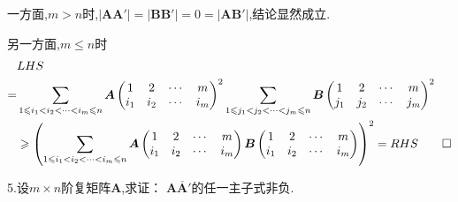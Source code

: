 \begin{Proof}
一方面,$m > n$时,$\left|
    \bm{AA}'
\right|=\left|
    \bm{BB}'
\right|=0=\left|
    \bm{AB}'
\right|$,结论显然成立.

另一方面,$m\leqslant n$时
\begin{align*}
    &LHS\\
    =&\sum_{
        1\leqslant i_1<i_2<\cdots<i_m\leqslant n
    }\bm{A}\begin{pmatrix}
        1&2&\cdots&m\\
        i_1&i_2&\cdots&i_m
    \end{pmatrix}^2\sum_{
        1\leqslant j_1<j_2<\cdots<j_m\leqslant n
    }\bm{B}\begin{pmatrix}
        1&2&\cdots&m\\
        j_1&j_2&\cdots&j_m
    \end{pmatrix}^2\\
    &\geqslant\left(
        \sum_{
            1\leqslant i_1<i_2<\cdots<i_m\leqslant n
        }\bm{A}\begin{pmatrix}
            1&2&\cdots&m\\
            i_1&i_2&\cdots&i_m
        \end{pmatrix}\bm{B}\begin{pmatrix}
            1&2&\cdots&m\\
            i_1&i_2&\cdots&i_m
        \end{pmatrix}
    \right)      ^2=RHS\qedhere               
\end{align*}
\end{Proof}
5.设$m\times n$阶复矩阵$\bm{A}$,求证：
$\bm{A}\overline{\bm{A}}'$的任一主子式非负.
